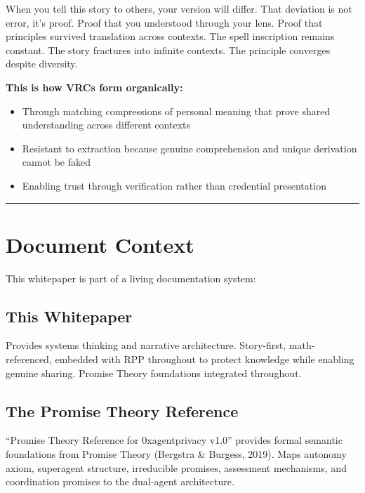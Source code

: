 \documentclass[
]{article}
\begin{document}
When you tell this story to others, your version will differ. That
deviation is not error, it's proof. Proof that you understood through
your lens. Proof that principles survived translation across contexts.
The spell inscription remains constant. The story fractures into
infinite contexts. The principle converges despite diversity.

\textbf{This is how VRCs form organically:}

\begin{itemize}
\item
  Through matching compressions of personal meaning that prove shared
  understanding across different contexts
\item
  Resistant to extraction because genuine comprehension and unique
  derivation cannot be faked
\item
  Enabling trust through verification rather than credential
  presentation
\end{itemize}

\begin{center}\rule{0.5\linewidth}{0.5pt}\end{center}

\section{Document Context}\label{document-context}

This whitepaper is part of a living documentation system:

\subsection{This Whitepaper}\label{this-whitepaper}

Provides systems thinking and narrative architecture. Story-first,
math-referenced, embedded with RPP throughout to protect knowledge while
enabling genuine sharing. Promise Theory foundations integrated
throughout.

\subsection{The Promise Theory
Reference}\label{the-promise-theory-reference}

``Promise Theory Reference for 0xagentprivacy v1.0'' provides formal
semantic foundations from Promise Theory (Bergstra \& Burgess, 2019).
Maps autonomy axiom, superagent structure, irreducible promises,
assessment mechanisms, and coordination promises to the dual-agent
architecture.
\end{document}
